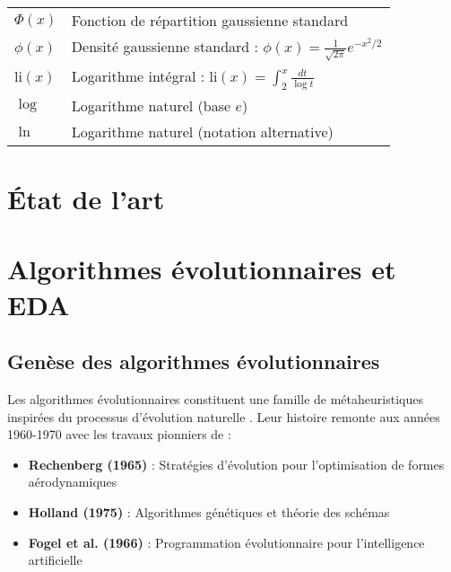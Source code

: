 \documentclass[12pt,a4paper]{article}
\theoremstyle{definition}
\theoremstyle{remark}
\begin{document}
	\begin{tabular}{ll}
		$\Phi(x)$ & Fonction de répartition gaussienne standard \\
		$\phi(x)$ & Densité gaussienne standard : $\phi(x) = \frac{1}{\sqrt{2\pi}}e^{-x^2/2}$ \\
		$\text{li}(x)$ & Logarithme intégral : $\text{li}(x) = \int_2^x \frac{dt}{\log t}$ \\
		$\log$ & Logarithme naturel (base $e$) \\
		$\ln$ & Logarithme naturel (notation alternative) \\
	\end{tabular}
	
	\newpage


\section{État de l'art}
\label{sec:etat-art}



\section{Algorithmes évolutionnaires et EDA}

\subsection{Genèse des algorithmes évolutionnaires}

Les algorithmes évolutionnaires constituent une famille de métaheuristiques inspirées du processus d'évolution naturelle \cite{back1997handbook}. Leur histoire remonte aux années 1960-1970 avec les travaux pionniers de :

\begin{itemize}
    \item \textbf{Rechenberg (1965)} : Stratégies d'évolution pour l'optimisation de formes aérodynamiques \cite{rechenberg1973evolutionsstrategie}
    
    \item \textbf{Holland (1975)} : Algorithmes génétiques et théorie des schémas \cite{holland1975adaptation}
    
    \item \textbf{Fogel et al. (1966)} : Programmation évolutionnaire pour l'intelligence artificielle \cite{fogel1966artificial}
\end{itemize}
\end{document}

